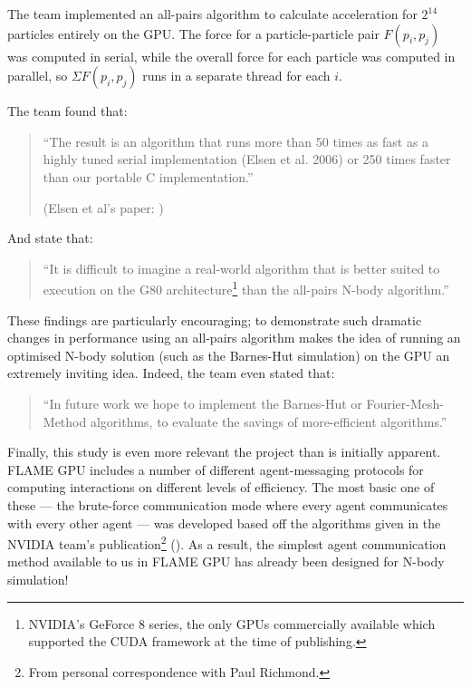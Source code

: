 \documentclass[11pt,a4paper]{article}
\begin{document}
The team implemented an all-pairs algorithm to calculate acceleration for $2^{14}$ particles entirely on the GPU. The force for a particle-particle pair $F(p_{i}, p_{j})$ was computed in serial, while the overall force for each particle was computed in parallel, so $\Sigma F(p_{i},p_{j})$ runs in a separate thread for each $i$.

The team found that:

\begin{quotation}
\noindent ``The result is an algorithm that runs more than 50 times as fast as a highly tuned serial implementation (Elsen et al. 2006) or 250 times faster than our portable C implementation.'' 

(Elsen et al's paper: \cite{elsen})
\end{quotation}

And state that:
\begin{quotation}\noindent ``It is difficult to imagine a real-world algorithm that is better suited to execution on the G80 architecture\footnote{NVIDIA's GeForce 8 series, the only GPUs commercially available which supported the CUDA framework at the time of publishing.} than the all-pairs N-body algorithm.''
\end{quotation}

\noindent These findings are particularly encouraging; to demonstrate such dramatic changes in performance using an all-pairs algorithm makes the idea of running an optimised N-body solution (such as the Barnes-Hut simulation) on the GPU an extremely inviting idea. Indeed, the team even stated that:
\begin{quotation}
\noindent ``In future work we hope to implement the Barnes-Hut or Fourier-Mesh-Method algorithms, to evaluate the savings of more-efficient algorithms.''
\end{quotation}

\noindent Finally, this study is even more relevant the project than is initially apparent. FLAME GPU includes a number of different agent-messaging protocols for computing interactions on different levels of efficiency. The most basic one of these --- the brute-force communication mode where every agent communicates with every other agent --- was developed based off the algorithms given in the NVIDIA team's publication\footnote{From personal correspondence with Paul Richmond.} (\cite{gems}). As a result, the simplest agent communication method available to us in FLAME GPU has already been designed for N-body simulation!
\end{document}
